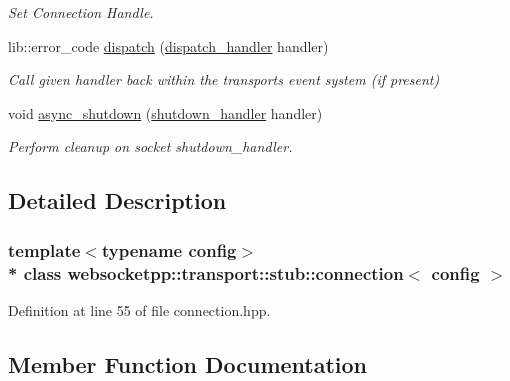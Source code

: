 \begin{DoxyCompactItemize}
\begin{DoxyCompactList}\small\item\em Set Connection Handle. \end{DoxyCompactList}\item 
lib\+::error\+\_\+code \hyperlink{classwebsocketpp_1_1transport_1_1stub_1_1connection_a8a02eae7fd9209b0c953feb931dc781c}{dispatch} (\hyperlink{namespacewebsocketpp_1_1transport_a6658447b2e10f4c712dd792aad0e0c78}{dispatch\+\_\+handler} handler)
\begin{DoxyCompactList}\small\item\em Call given handler back within the transport\textquotesingle{}s event system (if present) \end{DoxyCompactList}\item 
void \hyperlink{classwebsocketpp_1_1transport_1_1stub_1_1connection_ac6a43b32fd72e5d51e175f9431d314da}{async\+\_\+shutdown} (\hyperlink{namespacewebsocketpp_1_1transport_af39aff6fc4cb76f7df0d5322b734d156}{shutdown\+\_\+handler} handler)
\begin{DoxyCompactList}\small\item\em Perform cleanup on socket shutdown\+\_\+handler. \end{DoxyCompactList}\end{DoxyCompactItemize}


\subsection{Detailed Description}
\subsubsection*{template$<$typename config$>$\\*
class websocketpp\+::transport\+::stub\+::connection$<$ config $>$}



Definition at line 55 of file connection.\+hpp.



\subsection{Member Function Documentation}
